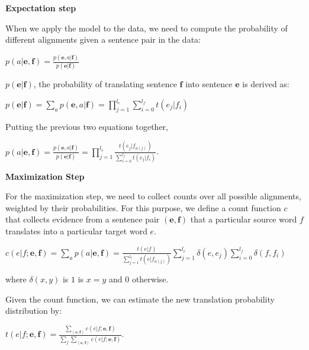 \documentclass[11pt]{book}
\theoremstyle{plain}
\begin{document}
 \textbf{Expectation step\\}

When we apply the model to the data, we need to compute the
probability of different alignments given a sentence pair in the
data:

\begin{center}
$p(a|\textbf{e},\textbf{f}) =
\frac{p(\textbf{e},a|\textbf{f})}{p(\textbf{e}|\textbf{f})}$
\end{center}

$p(\textbf{e}|\textbf{f})$, the probability of translating sentence
$\textbf{f}$ into sentence $\textbf{e}$ is derived as:

\begin{center}

$p(\textbf{e}|\textbf{f}) = \sum_a p(\textbf{e},a|\textbf{f}) =
\prod_{j=1}^{l_e} \sum_{i=0}^{l_f}t(e_j|f_i)$
\end{center}

Putting the previous two equations together,

\begin{center}

 $p(a|\textbf{e},\textbf{f}) =
\frac{p(\textbf{e},a|\textbf{f})}{p(\textbf{e}|\textbf{f})}
=\prod_{j=1}^{l_e} \frac {t(e_j | f_{a(j)})}{\sum_{i=0}^{l_f}
t(e_j|f_i)}$.


\end{center}

\textbf{Maximization Step}

For the maximization step, we need to collect counts over all
possible alignments, weighted by their probabilities. For this
purpose, we define a count function $c$ that collects evidence from
a sentence pair $(\textbf{e},\textbf{f})$ that a particular source
word $f$  translates into a particular target word $e$.

\begin{center}

$c(e|f;\textbf{e},\textbf{f}) = \sum_a p(a|\textbf{e},\textbf{f}) =
\frac{t(e|f)}{\sum_{j=1}^{l_e}t(e|f_{a(j)})} \sum_{j=1}^{l_e}
\delta(e,e_j)\sum_{i=0}^{l_f}\delta(f,f_i)$

\end{center}

where $\delta(x,y)$ is $1$ is $x=y$ and $0$ otherwise.

Given the count function, we can estimate the new translation
probability distribution by:

\begin{center}
$t(e|f;\textbf{e},\textbf{f}) =
\frac{\sum_{(\textbf{e},\textbf{f})}c(e|f;\textbf{e},\textbf{f})}{\sum_f\sum_{(\textbf{e},\textbf{f})}c(e|f;\textbf{e},\textbf{f})}$.
\end{center}
\end{document}
